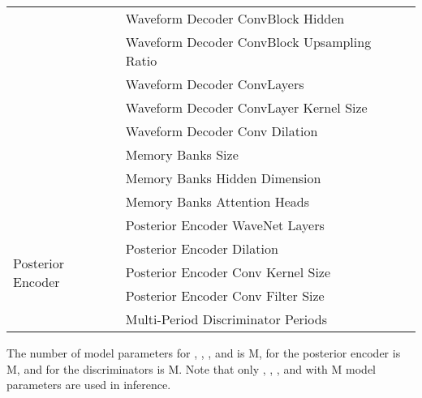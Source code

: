 \documentclass{article}
\theoremstyle{definition}
\begin{document}
\begin{table}[h!]
\begin{tabular}{llc}
    &Waveform Decoder ConvBlock Hidden &  \\
    &Waveform Decoder ConvBlock Upsampling Ratio &  \\
    &Waveform Decoder ConvLayers &  \\
    &Waveform Decoder ConvLayer Kernel Size &  \\
    &Waveform Decoder Conv Dilation &  \\
    &Memory Banks Size &  \\
    &Memory Banks Hidden Dimension &  \\
    &Memory Banks Attention Heads &  \\
    \midrule
    \midrule
    \multirow{5}{*}{Posterior Encoder }&Posterior Encoder WaveNet Layers &  \\
    &Posterior Encoder Dilation &   \\
    &Posterior Encoder Conv Kernel Size &  \\
    &Posterior Encoder Conv Filter Size &  \\
    \midrule
    Discriminator  & Multi-Period Discriminator Periods &  \\
    \bottomrule
    \end{tabular}
    \label{tab_hyperpara}
\end{table}


The number of model parameters for , , , and  is M, for the posterior encoder  is M, and for the discriminators is M. Note that only , , , and  with M model parameters are used in inference. 
\end{document}
